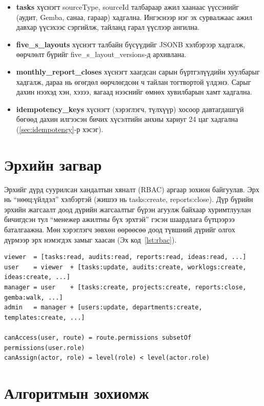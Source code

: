 \begin{itemize}
    \item \textbf{tasks} хүснэгт sourceType, sourceId талбараар ажил хаанаас үүссэнийг (аудит, Gemba, санаа, гараар) хадгална. Ингэснээр нэг эх сурвалжаас ажил давхар үүсэхээс сэргийлж, тайланд гарал үүслээр ангилна.
    \item \textbf{five\_s\_layouts} хүснэгт талбайн бүсүүдийг JSONB хэлбэрээр хадгалж, өөрчлөлт бүрийг five\_s\_layout\_versions-д архивлана.
    \item \textbf{monthly\_report\_closes} хүснэгт хаагдсан сарын бүртгэлүүдийн хуулбарыг хадгалж, дараа нь өгөгдөл өөрчлөгдсөн ч тайлан тогтвортой үлдэнэ. Сарыг дахин нээхэд хэн, хэзээ, яагаад нээснийг өмнөх хувилбарын хамт хадгална.
    \item \textbf{idempotency\_keys} хүснэгт (хэрэглэгч, түлхүүр) хосоор давтагдашгүй бөгөөд дахин илгээсэн бичих хүсэлтийн анхны хариуг 24 цаг хадгална (\ref{sec:idempotency}-р хэсэг).
\end{itemize}

\section{Эрхийн загвар}
Эрхийг дүрд суурилсан хандалтын хяналт (RBAC) аргаар зохион байгуулав. Эрх нь ``нөөц:үйлдэл'' хэлбэртэй (жишээ нь tasks:create, reports:close). Дүр бүрийн эрхийн жагсаалт доод дүрийн жагсаалтыг бүрэн агуулж байхаар хуримтлуулан бичигдсэн тул ``менежер ажилтны бүх эрхтэй'' гэсэн шаардлага бүтцээрээ баталгаажна. Мөн хэрэглэгч зөвхөн өөрөөсөө доод түвшний дүрийг олгох дүрмээр эрх нэмэгдэх замыг хаасан (Эх код~\ref{lst:rbac}).

\begin{lstlisting}[caption={Эрхийн загвар},label={lst:rbac}]
viewer  = [tasks:read, audits:read, reports:read, ideas:read, ...]
user    = viewer  + [tasks:update, audits:create, worklogs:create, ideas:create, ...]
manager = user    + [tasks:create, projects:create, reports:close, gemba:walk, ...]
admin   = manager + [users:update, departments:create, templates:create, ...]

canAccess(user, route) = route.permissions subsetOf permissions(user.role)
canAssign(actor, role) = level(role) < level(actor.role)
\end{lstlisting}

\section{Алгоритмын зохиомж}
\label{sec:algorithms}

